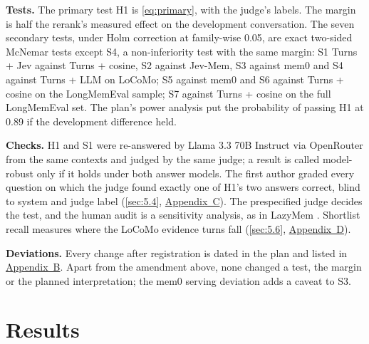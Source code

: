 \documentclass[11pt]{article}
\newcommand{\src}[1]{}
\begin{document}
\textbf{Tests.} The primary test H1 is \cref{eq:primary}, with the judge's labels. The margin is half the rerank's measured effect on the development conversation. The seven secondary tests, under Holm correction at family-wise 0.05, are exact two-sided McNemar tests except S4, a non-inferiority test with the same margin: S1 Turns + Jev against Turns + cosine, S2 against Jev-Mem, S3 against mem0 and S4 against Turns + LLM on LoCoMo; S5 against mem0 and S6 against Turns + cosine on the LongMemEval sample; S7 against Turns + cosine on the full LongMemEval set. The plan's power analysis put the probability of passing H1 at 0.89\src{docs/V3\_PLAN.md §1, §2, §4} if the development difference held.

\textbf{Checks.} H1 and S1 were re-answered by Llama 3.3 70B Instruct via OpenRouter from the same contexts and judged by the same judge; a result is called model-robust only if it holds under both answer models. The first author graded every question on which the judge found exactly one of H1's two answers correct, blind to system and judge label (\cref{sec:5.4}, \hyperref[app:C]{Appendix~C}). The prespecified judge decides the test, and the human audit is a sensitivity analysis, as in LazyMem \citep{yu2026lazymem}. Shortlist recall measures where the LoCoMo evidence turns fall (\cref{sec:5.6}, \hyperref[app:D]{Appendix~D}).

\textbf{Deviations.} Every change after registration is dated in the plan and listed in \hyperref[app:B]{Appendix~B}. Apart from the amendment above, none changed a test, the margin or the planned interpretation; the mem0 serving deviation adds a caveat to S3.

\section{Results}\label{sec:5}
\end{document}

